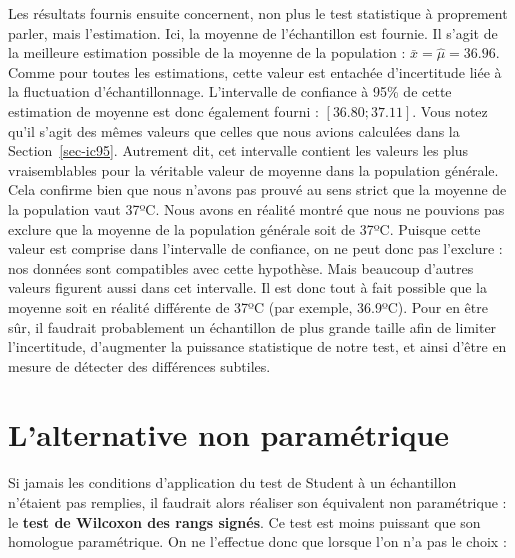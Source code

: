 \documentclass[
  french,
  a4paper,
  DIV=11,
  numbers=noendperiod,
  oneside]{scrreprt}
\newenvironment{Shaded}{}{}
\newcommand{\AttributeTok}[1]{\textcolor[rgb]{0.84,0.23,0.29}{#1}}
\newcommand{\ConstantTok}[1]{\textcolor[rgb]{0.00,0.36,0.77}{#1}}
\newcommand{\DecValTok}[1]{\textcolor[rgb]{0.00,0.36,0.77}{#1}}
\newcommand{\FunctionTok}[1]{\textcolor[rgb]{0.44,0.26,0.76}{#1}}
\newcommand{\NormalTok}[1]{\textcolor[rgb]{0.14,0.16,0.18}{#1}}
\newcommand{\SpecialCharTok}[1]{\textcolor[rgb]{0.00,0.36,0.77}{#1}}
\begin{document}
Les résultats fournis ensuite concernent, non plus le test statistique à
proprement parler, mais l'estimation. Ici, la moyenne de l'échantillon
est fournie. Il s'agit de la meilleure estimation possible de la moyenne
de la population : \(\bar{x} = \hat{\mu} = 36.96\). Comme pour toutes
les estimations, cette valeur est entachée d'incertitude liée à la
fluctuation d'échantillonnage. L'intervalle de confiance à 95\% de cette
estimation de moyenne est donc également fourni : \([36.80 ; 37.11]\).
Vous notez qu'il s'agit des mêmes valeurs que celles que nous avions
calculées dans la Section~\ref{sec-ic95}. Autrement dit, cet intervalle
contient les valeurs les plus vraisemblables pour la véritable valeur de
moyenne dans la population générale. Cela confirme bien que nous n'avons
pas prouvé au sens strict que la moyenne de la population vaut 37ºC.
Nous avons en réalité montré que nous ne pouvions pas exclure que la
moyenne de la population générale soit de 37ºC. Puisque cette valeur est
comprise dans l'intervalle de confiance, on ne peut donc pas l'exclure :
nos données sont compatibles avec cette hypothèse. Mais beaucoup
d'autres valeurs figurent aussi dans cet intervalle. Il est donc tout à
fait possible que la moyenne soit en réalité différente de 37ºC (par
exemple, 36.9ºC). Pour en être sûr, il faudrait probablement un
échantillon de plus grande taille afin de limiter l'incertitude,
d'augmenter la puissance statistique de notre test, et ainsi d'être en
mesure de détecter des différences subtiles.

\section{L'alternative non
paramétrique}\label{lalternative-non-paramuxe9trique}

Si jamais les conditions d'application du test de Student à un
échantillon n'étaient pas remplies, il faudrait alors réaliser son
équivalent non paramétrique : le \textbf{test de Wilcoxon des rangs
signés}. Ce test est moins puissant que son homologue paramétrique. On
ne l'effectue donc que lorsque l'on n'a pas le choix :

\begin{Shaded}
\end{Shaded}
\end{document}

